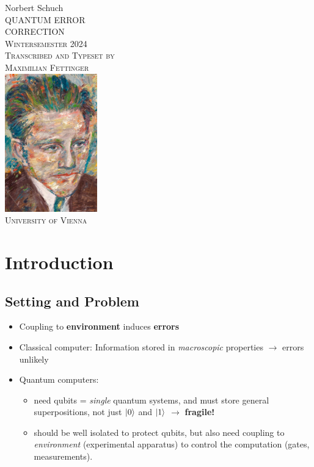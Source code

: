 \documentclass[a4paper, 12pt]{article}
\date{\today}
\theoremstyle{plain}
\theoremstyle{definition}
\theoremstyle{remark}
\begin{document}
\begin{titlepage}
  \centering
  \vspace*{0.06\textheight}
  {\large Norbert Schuch}\\[\baselineskip]
  {\Huge QUANTUM ERROR}\\[\baselineskip]
  {\Huge CORRECTION}\\[\baselineskip]
  {\small\scshape Wintersemester 2024}\\[\baselineskip]
  {\scshape Transcribed and Typeset by}\\
  {\large\scshape Maximilian Fettinger}\\[2\baselineskip]
  {\includegraphics[width=0.3\textwidth]{heisenberg.png}}\\[\baselineskip]
  {\small\scshape University of Vienna}\par
  \vfill\null
\end{titlepage}

\section{Introduction}
\subsection{Setting and Problem}

\begin{itemize}
  \item Coupling to \textbf{environment} induces \textbf{errors}
  \item Classical computer: Information stored in \emph{macroscopic} properties $\rightarrow$ errors unlikely
  \item Quantum computers:
    \begin{itemize}
      \item need qubits = \emph{single} quantum systems, and must store general superpositions, not just $\ket{0}$ and $\ket{1}$ $\rightarrow$ \textbf{fragile!}
      \item should be well isolated to protect qubits, but also need coupling to \emph{environment} (experimental apparatus) to control the computation (gates, measurements).
    \end{itemize}
\end{itemize}
\end{document}
